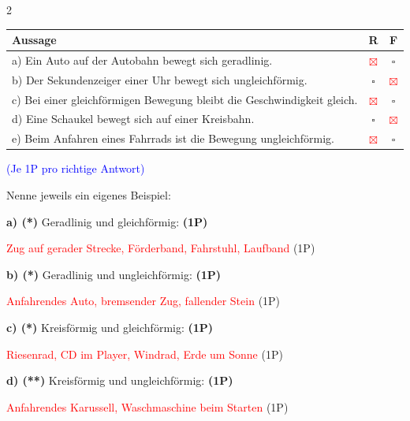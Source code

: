 \documentclass[11pt,a4paper]{article}
\begin{document}
\begin{multicols}{2}
\begin{tcolorbox}[title={4: Richtig oder Falsch?}]
\vspace{2mm}
\begin{tabular}{|p{6.2cm}|c|c|}
\hline
\textbf{Aussage} & \textbf{R} & \textbf{F} \\
\hline
a) Ein Auto auf der Autobahn bewegt sich geradlinig. & \textcolor{red}{$\boxtimes$} & $\square$ \\
\hline
b) Der Sekundenzeiger einer Uhr bewegt sich ungleichförmig. & $\square$ & \textcolor{red}{$\boxtimes$} \\
\hline
c) Bei einer gleichförmigen Bewegung bleibt die Geschwindigkeit gleich. & \textcolor{red}{$\boxtimes$} & $\square$ \\
\hline
d) Eine Schaukel bewegt sich auf einer Kreisbahn. & $\square$ & \textcolor{red}{$\boxtimes$} \\
\hline
e) Beim Anfahren eines Fahrrads ist die Bewegung ungleichförmig. & \textcolor{red}{$\boxtimes$} & $\square$ \\
\hline
\end{tabular}

\vspace{1mm}
\textcolor{blue}{\scriptsize (Je 1P pro richtige Antwort)}
\end{tcolorbox}

\begin{tcolorbox}[title={5: Eigene Beispiele aus dem Alltag}]
\small
Nenne jeweils ein eigenes Beispiel:

\vspace{2mm}
\textbf{a) (*)} Geradlinig und gleichförmig: \textbf{(1P)}

\textcolor{red}{Zug auf gerader Strecke, Förderband, Fahrstuhl, Laufband} {\color{blue}(1P)}

\vspace{2mm}
\textbf{b) (*)} Geradlinig und ungleichförmig: \textbf{(1P)}

\textcolor{red}{Anfahrendes Auto, bremsender Zug, fallender Stein} {\color{blue}(1P)}

\vspace{2mm}
\textbf{c) (*)} Kreisförmig und gleichförmig: \textbf{(1P)}

\textcolor{red}{Riesenrad, CD im Player, Windrad, Erde um Sonne} {\color{blue}(1P)}

\vspace{2mm}
\textbf{d) (**)} Kreisförmig und ungleichförmig: \textbf{(1P)}

\textcolor{red}{Anfahrendes Karussell, Waschmaschine beim Starten} {\color{blue}(1P)}


\end{tcolorbox}
\end{multicols}
\end{document}
